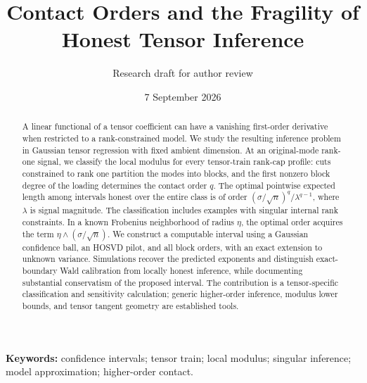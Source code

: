 \documentclass[11pt]{article}
\title{Contact Orders and the Fragility of Honest Tensor Inference}
\author{Research draft for author review}
\date{7 September 2026}
\begin{document}
\maketitle
\begin{abstract}
A linear functional of a tensor coefficient can have a vanishing first-order derivative when restricted to a rank-constrained model. We study the resulting inference problem in Gaussian tensor regression with fixed ambient dimension. At an original-mode rank-one signal, we classify the local modulus for every tensor-train rank-cap profile: cuts constrained to rank one partition the modes into blocks, and the first nonzero block degree of the loading determines the contact order $q$. The optimal pointwise expected length among intervals honest over the entire class is of order $(\sigma/\sqrt n)^q/\lambda^{q-1}$, where $\lambda$ is signal magnitude. The classification includes examples with singular internal rank constraints. In a known Frobenius neighborhood of radius $\eta$, the optimal order acquires the term $\eta\wedge(\sigma/\sqrt n)$. We construct a computable interval using a Gaussian confidence ball, an HOSVD pilot, and all block orders, with an exact extension to unknown variance. Simulations recover the predicted exponents and distinguish exact-boundary Wald calibration from locally honest inference, while documenting substantial conservatism of the proposed interval. The contribution is a tensor-specific classification and sensitivity calculation; generic higher-order inference, modulus lower bounds, and tensor tangent geometry are established tools.
\end{abstract}
\noindent\textbf{Keywords:} confidence intervals; tensor train; local modulus; singular inference; model approximation; higher-order contact.







\clearpage

\clearpage
\appendix

\end{document}

